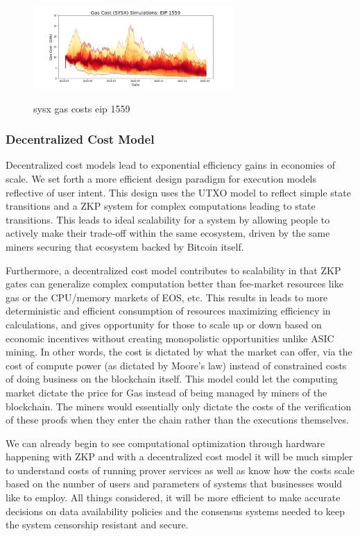 \documentclass[peerreview]{ieeesyscoin}
\begin{document}
\begin{figure}[h!]
\includegraphics[width=3in]{img/sysx_gas_costs_eip_1559.png}
\label{fig:sysx_gas_costs_eip_1559}
\caption{sysx gas costs eip 1559} 
\end{figure} 

\subsubsection{Decentralized Cost Model}

Decentralized cost models lead to exponential efficiency gains in economies of scale. We set forth a more efficient design paradigm for execution models reflective of user intent. This design uses the UTXO model to reflect simple state transitions and a ZKP system for complex computations leading to state transitions. This leads to ideal scalability for a system by allowing people to actively make their trade-off within the same ecosystem, driven by the same miners securing that ecosystem backed by Bitcoin itself.

Furthermore, a decentralized cost model contributes to scalability in that ZKP gates can generalize complex computation better than fee-market resources like gas or the CPU/memory markets of EOS, etc. This results in leads to more deterministic and efficient consumption of resources maximizing efficiency in calculations, and gives opportunity for those to scale up or down based on economic incentives without creating monopolistic opportunities unlike ASIC mining. In other words, the cost is dictated by what the market can offer, via the cost of compute power (as dictated by Moore's law) instead of constrained costs of doing business on the blockchain itself. This model could let the computing market dictate the price for Gas instead of being managed by miners of the blockchain. The miners would essentially only dictate the costs of the verification of these proofs when they enter the chain rather than the executions themselves.

We can already begin to see computational optimization through hardware happening with ZKP and with a decentralized cost model it will be much simpler to understand costs of running prover services as well as know how the costs scale based on the number of users and parameters of systems that businesses would like to employ. All things considered, it will be more efficient to make accurate decisions on data availability policies and the consensus systems needed to keep the system censorship resistant and secure.
\end{document}
